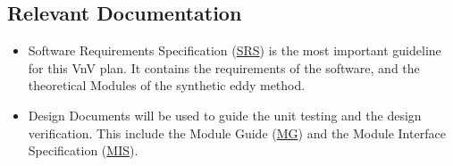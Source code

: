 \documentclass[12pt, titlepage]{article}
\begin{document}



\subsection{Relevant Documentation}

\begin{itemize}
  \item Software Requirements Specification (\href{https://github.com/omltcat/turbulent-flow/blob/main/docs/SRS/SRS.pdf}{SRS}) is the most important guideline for this VnV plan. It contains the requirements of the software, and the theoretical Modules of the synthetic eddy method. 
  \item Design Documents will be used to guide the unit testing and the design verification. This include the Module Guide (\href{https://github.com/omltcat/turbulent-flow/blob/main/docs/Design/SoftArchitecture/MG.pdf}{MG}) and the Module Interface Specification (\href{https://github.com/omltcat/turbulent-flow/blob/main/docs/Design/SoftDetailedDes/MIS.pdf}{MIS}). 
\end{itemize}

\end{document}
